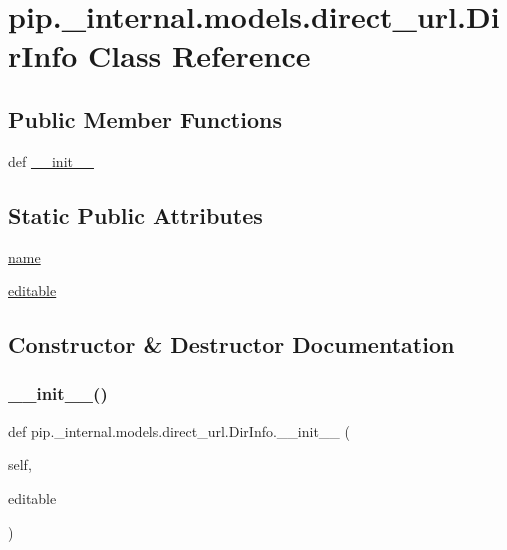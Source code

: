 \hypertarget{classpip_1_1__internal_1_1models_1_1direct__url_1_1DirInfo}{}\section{pip.\+\_\+internal.\+models.\+direct\+\_\+url.\+Dir\+Info Class Reference}
\label{classpip_1_1__internal_1_1models_1_1direct__url_1_1DirInfo}
\subsection*{Public Member Functions}
\begin{DoxyCompactItemize}
\item 
def \hyperlink{classpip_1_1__internal_1_1models_1_1direct__url_1_1DirInfo_a3c6d222078a9e99f8ebcf13d8bb151dc}{\+\_\+\+\_\+init\+\_\+\+\_\+}
\end{DoxyCompactItemize}
\subsection*{Static Public Attributes}
\begin{DoxyCompactItemize}
\item 
\hyperlink{classpip_1_1__internal_1_1models_1_1direct__url_1_1DirInfo_af1f493db41bd3ce77d436510296de4c0}{name}
\item 
\hyperlink{classpip_1_1__internal_1_1models_1_1direct__url_1_1DirInfo_a37ca2c2a848a7a7e0a02db404ae1281a}{editable}
\end{DoxyCompactItemize}


\subsection{Constructor \& Destructor Documentation}
\mbox{\label{classpip_1_1__internal_1_1models_1_1direct__url_1_1DirInfo_a3c6d222078a9e99f8ebcf13d8bb151dc}} 
\subsubsection{\texorpdfstring{\+\_\+\+\_\+init\+\_\+\+\_\+()}{\_\_init\_\_()}}
{\footnotesize\ttfamily def pip.\+\_\+internal.\+models.\+direct\+\_\+url.\+Dir\+Info.\+\_\+\+\_\+init\+\_\+\+\_\+ (\begin{DoxyParamCaption}\item[{}]{self,  }\item[{}]{editable }\end{DoxyParamCaption})}



